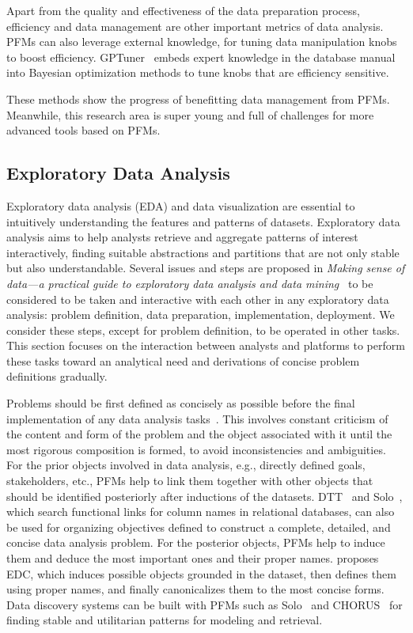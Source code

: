   Apart from the quality and effectiveness of the data preparation process, efficiency and data management are other important metrics of data analysis. PFMs can also leverage external knowledge, for tuning data manipulation knobs to boost efficiency. GPTuner~\cite{GPTuner} embeds expert knowledge in the database manual into Bayesian optimization methods to tune knobs that are efficiency sensitive.
  
  These methods show the progress of benefitting data management from PFMs. Meanwhile, this research area is super young and full of challenges for more advanced tools based on PFMs.
  
  \subsection{Exploratory Data Analysis}\label{sec:explore}
  
  Exploratory data analysis (EDA) and data visualization are essential to intuitively understanding the features and patterns of datasets. Exploratory data analysis aims to help analysts retrieve and aggregate patterns of interest interactively, finding suitable abstractions and partitions that are not only stable but also understandable. Several issues and steps are proposed in \textit{Making sense of data—a practical guide to exploratory data analysis and data mining}~\cite{myatt2007making} to be considered to be taken and interactive with each other in any exploratory data analysis: problem definition, data preparation, implementation, deployment. We consider these steps, except for problem definition, to be operated in other tasks. This section focuses on the interaction between analysts and platforms to perform these tasks toward an analytical need and derivations of concise problem definitions gradually. 
  
  
Problems should be first defined as concisely as possible before the final implementation of any data analysis tasks~\cite{myatt2007making}. This involves constant criticism of the content and form of the problem and the object associated with it until the most rigorous composition is formed, to avoid inconsistencies and ambiguities. For the prior objects involved in data analysis, e.g., directly defined goals, stakeholders, etc., PFMs help to link them together with other objects that should be identified posteriorly after inductions of the datasets. DTT~\cite{Nobari2023DTTAE} and Solo~\cite{Wang2023SoloDD}, which search functional links for column names in relational databases, can also be used for organizing objectives defined to construct a complete, detailed, and concise data analysis problem. For the posterior objects, PFMs help to induce them and deduce the most important ones and their proper names. \cite{ZhangS24} proposes EDC, which induces possible objects grounded in the dataset, then defines them using proper names, and finally canonicalizes them to the most concise forms. Data discovery systems can be built with PFMs such as Solo~\cite{Wang2023SoloDD} and CHORUS~\cite{CHORUS} for finding stable and utilitarian patterns for modeling and retrieval.
  
